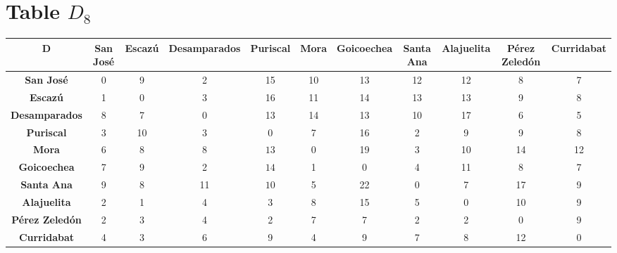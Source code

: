 \documentclass{article}
\begin{document}
\section{Table $D_{8}$}
\begin{center}
    \begin{tabular}{|c||c|c|c|c|c|c|c|c|c|c|}
        \hline
        \textbf{D} & \textbf{San José} & \textbf{Escazú} & \textbf{Desamparados} & \textbf{Puriscal} & \textbf{Mora} & \textbf{Goicoechea} & \textbf{Santa Ana} & \textbf{Alajuelita} & \textbf{Pérez Zeledón} & \textbf{Curridabat} \\
        \hline
        \hline
        \textbf{San José}& 0 & 9 & 2 & 15 & 10 & 13 & 12 & 12 & 8 & 7 \\
        \hline
        \textbf{Escazú}& 1 & 0 & 3 & 16 & 11 & 14 & 13 & 13 & 9 & 8 \\
        \hline
        \textbf{Desamparados}& 8 & 7 & 0 & 13 & 14 & 13 & 10 & 17 & 6 & 5 \\
        \hline
        \textbf{Puriscal}& 3 & 10 & 3 & 0 & 7 & 16 & 2 & 9 & 9 & 8 \\
        \hline
        \textbf{Mora}& 6 & 8 & 8 & \cellcolor[HTML]{D74894}$13$ & 0 & 19 & 3 & 10 & 14 & 12 \\
        \hline
        \textbf{Goicoechea}& 7 & 9 & 2 & \cellcolor[HTML]{D74894}$14$ & 1 & 0 & 4 & 11 & 8 & 7 \\
        \hline
        \textbf{Santa Ana}& 9 & \cellcolor[HTML]{D74894}$8$ & 11 & \cellcolor[HTML]{D74894}$10$ & 5 & 22 & 0 & 7 & 17 & 9 \\
        \hline
        \textbf{Alajuelita}& 2 & 1 & 4 & 3 & 8 & 15 & 5 & 0 & 10 & 9 \\
        \hline
        \textbf{Pérez Zeledón}& 2 & \cellcolor[HTML]{D74894}$3$ & 4 & 2 & 7 & 7 & 2 & 2 & 0 & 9 \\
        \hline
        \textbf{Curridabat}& 4 & 3 & 6 & 9 & 4 & 9 & 7 & 8 & 12 & 0 \\
        \hline
    \end{tabular}
\end{center}
\end{document}
